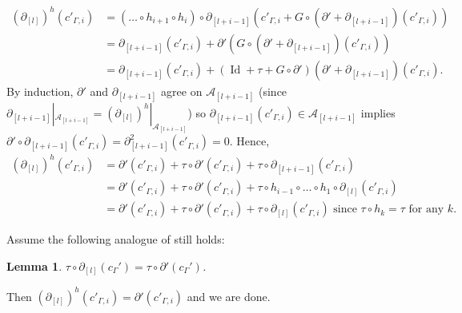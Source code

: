 \documentclass[11pt]{amsart}
\theoremstyle{mystyle}
\newtheorem{lemma}[lemma]{Lemma}
\newcommand{\<}{\langle}
\renewcommand{\>}{\rangle}
\DeclareMathOperator{\Id}{Id}
\begin{document}
\begin{align*}
    (\partial_{[l]})^h(c'_{\Gamma, i}) &= (\dots \circ h_{i+1} \circ h_i) \circ \partial_{[l+i-1]} (c'_{\Gamma, i} + G \circ (\partial' + \partial_{[l+i-1]})(c'_{\Gamma, i})) \\
    &= \partial_{[l+i-1]} (c'_{\Gamma, i}) + \partial' (G \circ (\partial' + \partial_{[l+i-1]})(c'_{\Gamma, i})) \\
    &= \partial_{[l+i-1]} (c'_{\Gamma, i}) + (\Id + \tau + G \circ \partial') (\partial' + \partial_{[l+i-1]})(c'_{\Gamma, i}).
\end{align*} By induction, $\partial'$ and $\partial_{[l+i-1]}$ agree on $\mathcal{A}_{[l+i-1]}$ (since $\partial_{[l+i-1]}|_{\mathcal{A}_{[l+i-1]}} = (\partial_{[l]})^h|_{\mathcal{A}_{[l+i-1]}}$) so $\partial_{[l+i-1]}(c'_{\Gamma, i}) \in \mathcal{A}_{[l+i-1]}$ implies $\partial' \circ \partial_{[l+i-1]}(c'_{\Gamma, i}) = \partial_{[l+i-1]}^2 (c'_{\Gamma, i}) = 0$. Hence, \begin{align*}
    (\partial_{[l]})^h(c'_{\Gamma, i}) &= \partial'(c'_{\Gamma, i}) + \tau \circ \partial'(c'_{\Gamma, i}) + \tau \circ \partial_{[l+i-1]}(c'_{\Gamma, i}) \\
    &= \partial'(c'_{\Gamma, i}) + \tau \circ \partial'(c'_{\Gamma, i}) + \tau \circ h_{i-1} \circ \dots \circ h_1 \circ \partial_{[l]}(c'_{\Gamma, i}) \\
    &= \partial'(c'_{\Gamma, i}) + \tau \circ \partial'(c'_{\Gamma, i}) + \tau \circ \partial_{[l]}(c'_{\Gamma, i}) \text{ since } \tau \circ h_k = \tau \text{ for any } k.
\end{align*}

Assume the following analogue of \cite[Lemma 8.2(b)]{chekanov2002dga} still holds: \begin{lemma}\label{projectionLemma}\vphantom{}
    $\tau \circ \partial_{[l]}(c_\Gamma') = \tau \circ \partial'(c_\Gamma')$.
\end{lemma} Then $(\partial_{[l]})^h(c'_{\Gamma, i}) = \partial'(c'_{\Gamma, i})$ and we are done. \\
	
\end{document}
